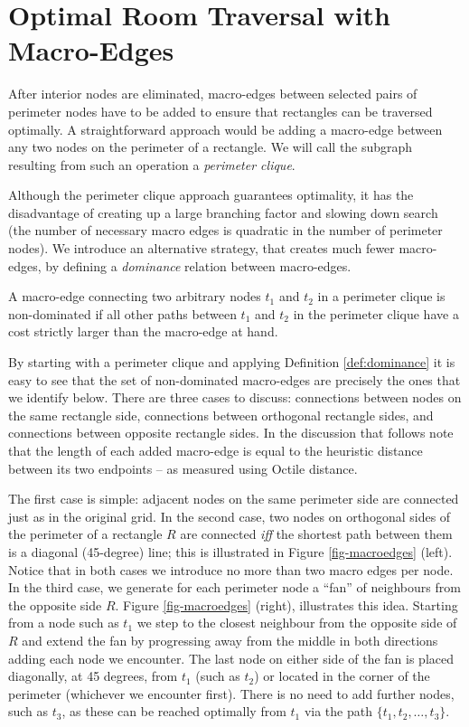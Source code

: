 \section{Optimal Room Traversal with Macro-Edges}

After interior nodes are eliminated, macro-edges between selected pairs of
perimeter nodes have to be added to ensure that rectangles can be traversed
optimally.  A straightforward approach would be adding a macro-edge between any
two nodes on the perimeter of a rectangle.  We will call the subgraph resulting
from such an operation a \emph{perimeter clique}.

Although the perimeter clique approach guarantees optimality, it has the
disadvantage of creating up a large branching factor and slowing down search
(the number of necessary macro edges is quadratic in the number of 
perimeter nodes).  We
introduce an alternative strategy, that creates much fewer macro-edges, by
defining a \emph{dominance} relation between macro-edges.

\begin{definition}
\label{def:dominance}
A macro-edge connecting two arbitrary nodes $t_1$ and $t_2$ in a perimeter
clique is non-dominated if all other paths between $t_1$ and $t_2$ in the
perimeter clique have a cost strictly larger than the macro-edge at hand.
\end{definition}

By starting with a perimeter clique and applying Definition \ref{def:dominance}
it is easy to see that the set of non-dominated macro-edges are precisely the
ones that we identify below.  There are three cases to discuss: connections
between nodes on the same rectangle side, connections between orthogonal
rectangle sides, and connections between opposite rectangle sides.
In the discussion that follows note that the length of each added macro-edge 
is equal to the heuristic distance between its two endpoints -- as measured
using Octile distance.

The first case is simple: adjacent nodes on the same perimeter side are connected
just as in the original grid. 
In the second case, two nodes on orthogonal sides of the perimeter of a rectangle
$R$ are connected \emph{iff} the shortest path between them is a diagonal
(45-degree) line; this is illustrated in Figure \ref{fig-macroedges} (left).
Notice that in both cases we introduce no more than two macro edges per node.
In the third case, we generate for each perimeter node a ``fan'' of neighbours
from the opposite side $R$.  Figure \ref{fig-macroedges} (right), illustrates
this idea.  Starting from a node such as $t_{1}$ we step to the closest
neighbour from the opposite side of $R$ and extend the fan by progressing away
from the middle in both directions adding each node we encounter.  The last node
on either side of the fan is placed diagonally, at 45 degrees, from $t_{1}$
(such as $t_{2}$) or located in the corner of the perimeter (whichever we
encounter first).  There is no need to add further nodes, such as $t_{3}$, as
these can be reached optimally from $t_1$ via the path $\lbrace t_1, t_2, \dots,
t_3\rbrace$.

